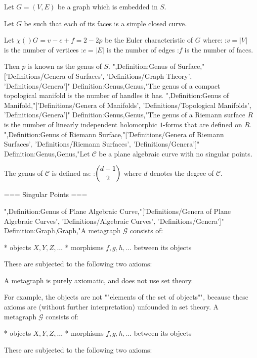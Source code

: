 Let $G = \left( V, E \right)$ be a graph which is embedded in $S$.

Let $G$ be such that each of its faces is a simple closed curve.

Let $\chi \left(   \right)G = v - e + f = 2 - 2 p$ be the Euler characteristic of $G$ where:
:$v = \left\lvert V \right\rvert$ is the number of vertices
:$e = \left\lvert E \right\rvert$ is the number of edges
:$f$ is the number of faces.

Then $p$ is known as the genus of $S$.
",Definition:Genus of Surface,"['Definitions/Genera of Surfaces', 'Definitions/Graph Theory', 'Definitions/Genera']"
Definition:Genus,Genus,"The genus of a compact topological manifold is the number of handles it has.
",Definition:Genus of Manifold,"['Definitions/Genera of Manifolds', 'Definitions/Topological Manifolds', 'Definitions/Genera']"
Definition:Genus,Genus,"The genus of a Riemann surface $R$ is the number of linearly independent holomorphic $1$-forms that are defined on $R$.
",Definition:Genus of Riemann Surface,"['Definitions/Genera of Riemann Surfaces', 'Definitions/Riemann Surfaces', 'Definitions/Genera']"
Definition:Genus,Genus,"Let $\mathcal C$ be a plane algebraic curve with no singular points.

The genus of $\mathcal C$ is defined as:
:$\dbinom {d - 1} 2$
where $d$ denotes the degree of $\mathcal C$.


=== Singular Points ===

",Definition:Genus of Plane Algebraic Curve,"['Definitions/Genera of Plane Algebraic Curves', 'Definitions/Algebraic Curves', 'Definitions/Genera']"
Definition:Graph,Graph,"A metagraph $\mathcal G$ consists of:

* objects $X, Y, Z, \ldots$
* morphisms $f, g, h, \ldots$ between its objects

These are subjected to the following two axioms:







A metagraph is purely axiomatic, and does not use set theory.

For example, the objects are not ""elements of the set of objects"", because these axioms are (without further interpretation) unfounded in set theory.
A metagraph $\mathcal G$ consists of:

* objects $X, Y, Z, \ldots$
* morphisms $f, g, h, \ldots$ between its objects

These are subjected to the following two axioms:







